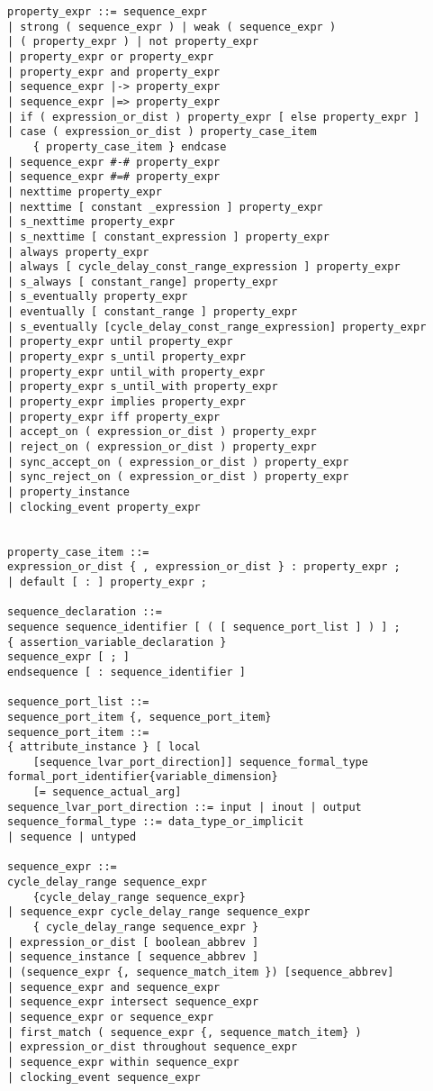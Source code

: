\documentclass[conference]{IEEEtran}
\begin{document}
\begin{lstlisting}
property_expr ::= sequence_expr
| strong ( sequence_expr ) | weak ( sequence_expr )
| ( property_expr ) | not property_expr
| property_expr or property_expr
| property_expr and property_expr
| sequence_expr |-> property_expr
| sequence_expr |=> property_expr
| if ( expression_or_dist ) property_expr [ else property_expr ]
| case ( expression_or_dist ) property_case_item 
	{ property_case_item } endcase
| sequence_expr #-# property_expr
| sequence_expr #=# property_expr
| nexttime property_expr
| nexttime [ constant _expression ] property_expr
| s_nexttime property_expr
| s_nexttime [ constant_expression ] property_expr
| always property_expr
| always [ cycle_delay_const_range_expression ] property_expr
| s_always [ constant_range] property_expr
| s_eventually property_expr
| eventually [ constant_range ] property_expr
| s_eventually [cycle_delay_const_range_expression] property_expr
| property_expr until property_expr
| property_expr s_until property_expr
| property_expr until_with property_expr
| property_expr s_until_with property_expr
| property_expr implies property_expr
| property_expr iff property_expr
| accept_on ( expression_or_dist ) property_expr
| reject_on ( expression_or_dist ) property_expr
| sync_accept_on ( expression_or_dist ) property_expr
| sync_reject_on ( expression_or_dist ) property_expr
| property_instance
| clocking_event property_expr


property_case_item ::=
expression_or_dist { , expression_or_dist } : property_expr ;
| default [ : ] property_expr ;

sequence_declaration ::=
sequence sequence_identifier [ ( [ sequence_port_list ] ) ] ;
{ assertion_variable_declaration }
sequence_expr [ ; ]
endsequence [ : sequence_identifier ]

sequence_port_list ::=
sequence_port_item {, sequence_port_item}
sequence_port_item ::=
{ attribute_instance } [ local 
	[sequence_lvar_port_direction]] sequence_formal_type
formal_port_identifier{variable_dimension}
	[= sequence_actual_arg]
sequence_lvar_port_direction ::= input | inout | output
sequence_formal_type ::= data_type_or_implicit 
| sequence | untyped

sequence_expr ::=
cycle_delay_range sequence_expr 
	{cycle_delay_range sequence_expr}
| sequence_expr cycle_delay_range sequence_expr 
	{ cycle_delay_range sequence_expr }
| expression_or_dist [ boolean_abbrev ]
| sequence_instance [ sequence_abbrev ]
| (sequence_expr {, sequence_match_item }) [sequence_abbrev]
| sequence_expr and sequence_expr
| sequence_expr intersect sequence_expr
| sequence_expr or sequence_expr
| first_match ( sequence_expr {, sequence_match_item} )
| expression_or_dist throughout sequence_expr
| sequence_expr within sequence_expr
| clocking_event sequence_expr


\end{lstlisting}
\end{document}
